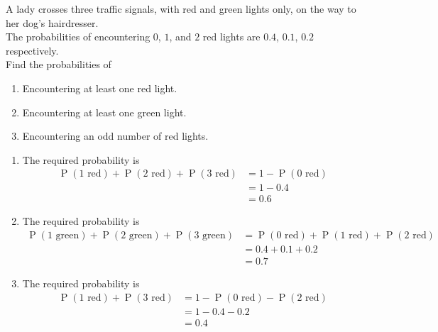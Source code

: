 \documentclass[titlepage, fleqn, a4paper, 12pt, twoside]{article}
\theoremstyle{definition}
\theoremstyle{theorem}
\DeclareMathOperator{\prob}{\mathrm{P}}
\begin{document}
\begin{question}
	A lady crosses three traffic signals, with red and green lights only, on the way to her dog's hairdresser.\\
	The probabilities of encountering $0$, $1$, and $2$ red lights are $0.4$, $0.1$, $0.2$ respectively.\\
	Find the probabilities of
	\begin{enumerate}
		\item Encountering at least one red light.
		\item Encountering at least one green light.
		\item Encountering an odd number of red lights.
	\end{enumerate}
\end{question}

\begin{solution}
	\begin{enumerate}[leftmargin=*]
		\item
			The required probability is
			\begin{align*}
				\prob(\text{$1$ red}) + \prob(\text{$2$ red}) + \prob(\text{$3$ red}) & = 1 - \prob(\text{$0$ red}) \\
                                                                                                      & = 1 - 0.4                   \\
                                                                                                      & = 0.6
			\end{align*}
		\item
			The required probability is
			\begin{align*}
				\prob(\text{$1$ green}) + \prob(\text{$2$ green}) + \prob(\text{$3$ green}) & = \prob(\text{$0$ red}) + \prob(\text{$1$ red}) + \prob(\text{$2$ red}) \\
                                                                                                            & = 0.4 + 0.1 + 0.2                                                       \\
                                                                                                            & = 0.7
			\end{align*}
		\item
			The required probability is
			\begin{align*}
				\prob(\text{$1$ red}) + \prob(\text{$3$ red}) & = 1 - \prob(\text{$0$ red}) - \prob(\text{$2$ red}) \\
                                                                              & = 1 - 0.4 - 0.2                                     \\
                                                                              & = 0.4
			\end{align*}
	\end{enumerate}
\end{solution}
\end{document}

